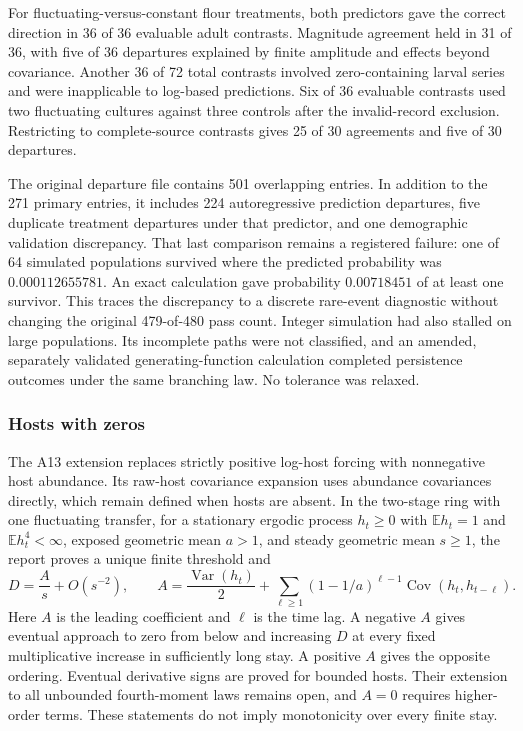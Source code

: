 For fluctuating-versus-constant flour treatments, both predictors gave the
correct direction in 36 of 36 evaluable adult contrasts. Magnitude agreement
held in 31 of 36, with five of 36 departures explained by finite amplitude
and effects beyond covariance. Another 36 of 72 total contrasts involved
zero-containing larval series and were inapplicable to log-based predictions.
Six of 36 evaluable contrasts used two fluctuating cultures against three
controls after the invalid-record exclusion. Restricting to complete-source
contrasts gives 25 of 30 agreements and five of 30 departures.

The original departure file contains 501 overlapping entries. In addition
to the 271 primary entries, it includes 224 autoregressive prediction
departures, five duplicate treatment departures under that predictor, and
one demographic validation discrepancy. That last comparison remains a
registered failure: one of 64 simulated populations survived where the
predicted probability was $0.000112655781$. An exact calculation gave
probability $0.00718451$ of at least one survivor. This traces the
discrepancy to a discrete rare-event diagnostic without changing the
original 479-of-480 pass count. Integer simulation had also stalled on
large populations. Its incomplete paths were not classified, and an
amended, separately validated generating-function calculation completed
persistence outcomes under the same branching law. No tolerance was relaxed.

\subsubsection{Hosts with zeros}
\label{num-esm-zeros}

The A13 extension replaces strictly positive log-host forcing with
nonnegative host abundance. Its raw-host covariance expansion uses
abundance covariances directly, which remain defined when hosts are absent.
In the two-stage ring with one fluctuating transfer, for a stationary
ergodic process $h_t\geq0$ with $\mathbb{E}h_t=1$ and
$\mathbb{E}h_t^4<\infty$, exposed geometric mean $a>1$, and steady
geometric mean $s\geq1$, the report proves a unique finite threshold and
\begin{equation}
 D=\frac{A}{s}+O(s^{-2}),\qquad
 A=\frac{\operatorname{Var}(h_t)}{2}
   +\sum_{\ell\geq1}(1-1/a)^{\ell-1}
      \operatorname{Cov}(h_t,h_{t-\ell}).
 \label{num-zero-expansion}
\end{equation}
Here $A$ is the leading coefficient and $\ell$ is the time lag. A negative
$A$ gives eventual approach to zero from below and increasing $D$ at every
fixed multiplicative increase in sufficiently long stay. A positive $A$
gives the opposite ordering. Eventual derivative signs are proved for
bounded hosts. Their extension to all unbounded fourth-moment laws remains
open, and $A=0$ requires higher-order terms. These statements do not imply
monotonicity over every finite stay.

